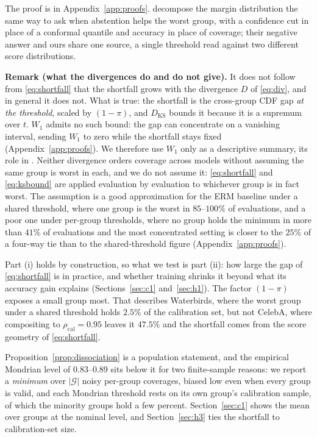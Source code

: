\documentclass[pdflatex,sn-basic]{sn-jnl}%
\theoremstyle{thmstyleone}%
\newcommand{\Wone}{W_1}
\newcommand{\rhocal}{\rho_{\mathrm{cal}}}
\begin{document}
\noindent The proof is in Appendix~\ref{app:proofs}. \citet{jones2021} decompose the margin
distribution the same way to ask when abstention helps the worst group, with a confidence cut in
place of a conformal quantile and accuracy in place of coverage; their negative answer and ours
share one source, a single threshold read against two different score distributions.

\noindent\textbf{Remark (what the divergences do and do not give).} It does not follow
from \eqref{eq:shortfall} that the shortfall grows with the divergence $D$ of
\eqref{eq:div}, and in general it does not. What is true: the shortfall is the
cross-group CDF gap \emph{at the threshold}, scaled by $(1-\pi)$, and $D_{\mathrm{KS}}$
bounds it because it is a supremum over $t$. $\Wone$ admits no such bound: the gap can
concentrate on a vanishing interval, sending $\Wone$ to zero while the shortfall stays
fixed (Appendix~\ref{app:proofs}). We therefore use $\Wone$ only as a descriptive summary, its role in
\citet{burden2026}. Neither divergence orders coverage across models without assuming
the same group is worst in each, and we do not assume it: \eqref{eq:shortfall} and
\eqref{eq:ksbound} are applied evaluation by evaluation to whichever group is in fact worst. The
assumption is a good approximation for the ERM baseline under a shared threshold, where one group
is the worst in $85$--$100\%$ of evaluations, and a poor one under per-group thresholds, where no
group holds the minimum in more than $41\%$ of evaluations and the most concentrated setting is closer to the
$25\%$ of a four-way tie than to the shared-threshold figure (Appendix~\ref{app:proofs}).

Part (i) holds by construction, so what we test is part (ii): how large the gap of
\eqref{eq:shortfall} is in practice, and whether training shrinks it beyond what its accuracy gain
explains (Sections~\ref{sec:c1} and~\ref{sec:h1}). The factor $(1-\pi)$ exposes a small group most.
That describes Waterbirds, where the worst group under a shared threshold holds $2.5\%$ of the
calibration set, but not CelebA, where compositing to $\rhocal=0.95$ leaves it $47.5\%$ and the
shortfall comes from the score geometry of \eqref{eq:shortfall}.

Proposition~\ref{prop:dissociation} is a population statement, and the empirical Mondrian level of
$0.83$--$0.89$ sits below it for two finite-sample reasons: we report a \emph{minimum} over
$|\mathcal{G}|$ noisy per-group coverages, biased low even when every group is valid, and each
Mondrian threshold rests on its own group's calibration sample, of which the minority groups hold a
few percent. Section~\ref{sec:c1} shows the mean over groups at the nominal level, and
Section~\ref{sec:h3} ties the shortfall to calibration-set size.
\end{document}
